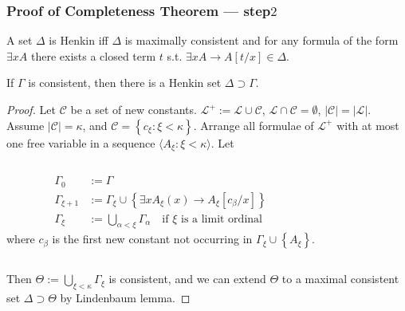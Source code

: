 \documentclass[UTF8,aspectratio=43,11pt,colorlinks,compress,openany]{beamer}%
\begin{document}
\begin{frame}\frametitle{Proof of Completeness Theorem --- step$2$}\vspace{-1pt}
	A set $\Delta$ is Henkin iff $\Delta$ is maximally consistent and for any formula of the form $\exists x A$ there exists a closed term $t$ s.t. $\exists x A\to A[t/x]\in\Delta$.\vspace{-1pt}
	\begin{lemma}
		If $\Gamma$ is consistent, then there is a Henkin set $\Delta\supset\Gamma$.
	\end{lemma}\vspace{-1pt}
	\begin{proof}
		Let $\mathcal{C}$ be a set of new constants. $\mathscr{L}^+:=\mathscr{L}\cup\mathcal{C}$, $\mathscr{L}\cap\mathcal{C}=\emptyset$, $|\mathcal{C}|=|\mathscr{L}|$.\\
		Assume $|\mathcal{C}|=\kappa$, and $\mathcal{C}=\left\{c_\xi: \xi<\kappa\right\}$. Arrange all formulae of $\mathscr{L}^+$ with at most one free variable in a sequence $\langle A_\xi: \xi<\kappa\rangle$. Let\vspace{-10pt}
		\begin{columns}
				\begin{align*}
				\Gamma_0&:=\Gamma\\
				\Gamma_{\xi+1}&:=\Gamma_{\xi}\cup\left\{\exists x A_\xi(x)\to A_\xi[c_\beta/x]\right\}\\
				\Gamma_\xi&:=\bigcup\limits_{\alpha<\xi}\Gamma_\alpha\quad\text{if $\xi$ is a limit ordinal}
				\end{align*}
				where $c_\beta$ is the first new constant not occurring in $\Gamma_\xi\cup\left\{A_\xi\right\}$.
		\end{columns}
		Then $\Theta:=\bigcup\limits_{\xi<\kappa}\Gamma_\xi$ is consistent, and we can extend $\Theta$ to a maximal consistent set $\Delta\supset\Theta$ by Lindenbaum lemma.
	\end{proof}
\end{frame}
\end{document}
